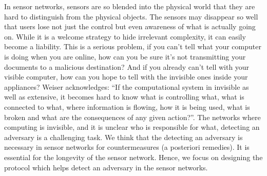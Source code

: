 	In sensor networks, sensors are so blended into the physical world that they are hard to distinguish from the physical objects.
	The sensors may disappear so well that users lose not just the control but even awareness of what is actually going on.
	While it is a welcome strategy to hide irrelevant complexity, it can easily become a liability.
	This is a serious problem, if you can't tell what your computer is doing when you are online, how can you be sure it's not transmitting your documents to a malicious destination? 
	And if you already can't tell with your visible computer, how can you hope to tell with the invisible ones inside your appliances? 
	Weiser \cite{weiser1999origins} acknowledges: 
	``If the computational system in invisible as well as extensive, it becomes hard to know what is controlling what, what is connected to what, where information is flowing, how it is being used, what is broken and what are the consequences of any given action?''.
	The networks where computing is invisible, and it is unclear who is responsible for what, detecting an adversary is a challenging task.
	We think that the detecting an adversary is necessary in sensor networks for countermeasures (a posteriori remedies).
	It is essential for the longevity of the sensor network.
	Hence, we focus on designing the protocol which helps detect an adversary in the sensor networks.

